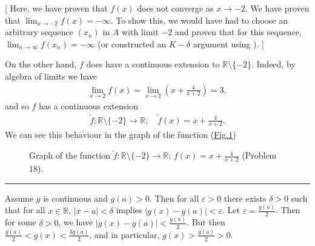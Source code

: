 \documentclass[letterpaper,10pt,english]{jupyterBook}
\let\sphinxpxdimen\pdfpxdimen\else\newdimen\sphinxpxdimen
\begin{document}
\sphinxAtStartPar
{[} Here, we have proven that \(f(x)\) does not converge as \(x\rightarrow-2\). We have  proven that \(\lim_{x\rightarrow -2} f(x)=-\infty\). To show this, we would have had to choose an arbitrary sequence \((x_n)\) in \(A\) with limit \(-2\) and proven that for this  sequence, \(\lim_{n\rightarrow\infty}f(x_n)=-\infty\) (or constructed an \(K-\delta\) argument using ). {]}

\sphinxAtStartPar
On the other hand, \(f\) does have a continuous extension to \(\mathbb{R}\setminus\{-2\}\). Indeed, by algebra of limits we have
\begin{equation*}
\begin{split}
\lim_{x \rightarrow 2}f(x) = \lim_{x\rightarrow 2}\left(x+\frac{4}{x+2}\right) = 3,
\end{split}
\end{equation*}
\sphinxAtStartPar
and so \(f\) has a continuous extension
\begin{equation*}
\begin{split}
\tilde{f}:\mathbb{R} \setminus \{-2\}\to\mathbb{R}; \hspace{1em} \tilde{f}(x) = x+\frac{4}{x+2}.
\end{split}
\end{equation*}
\sphinxAtStartPar
We can see this behaviour in the graph of the function (\hyperref[\detokenize{Solutions-upto46:q18}]{Fig.\@ \ref{\detokenize{Solutions-upto46:q18}}})

\begin{figure}[htbp]
\centering
\capstart

\noindent\sphinxincludegraphics[width=500\sphinxpxdimen]{{(x2+2x+4),(x+2)}.png}
\caption{Graph of the function \(\tilde{f}:\mathbb{R}\setminus\{-2\}\to\mathbb{R}\); \(f(x)=x+\frac{4}{x+2}\) (Problem 18).}\label{\detokenize{Solutions-upto46:q18}}\end{figure}


\bigskip\hrule\bigskip

\label{\detokenize{Solutions-upto46:id7}}
\sphinxAtStartPar
{\hyperref[\detokenize{Problems:id19}]{}}  Assume \(g\) is continuous and \(g(a) > 0\). Then for all \(\varepsilon>0\) there exists \(\delta>0\) such that for all \(x\in\mathbb{R}\), \(|x-a|<\delta\) implies \(|g(x)-g(a)|<\varepsilon\). Let \(\varepsilon=\frac{g(a)}{2}\). Then for some \(\delta>0\), we have \(|g(x)-g(a)|<\frac{g(a)}{2}\). But then \(\frac{g(a)}{2}<g(x)<\frac{3g(a)}{2}\), and in particular, \(g(x)>\frac{g(a)}{2}>0\).
\end{document}
